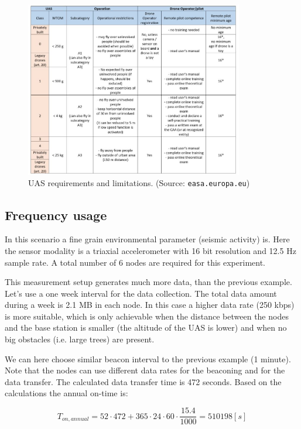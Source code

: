 \documentclass[conference]{IEEEtran}
\begin{document}
\begin{figure}[t]
	\centering
	\includegraphics[width=0.85\textwidth]{fig/legal.png}
  \caption{UAS requirements and limitations. (Source: \texttt{easa.europa.eu})}
	\label{fig-uav-legal}
\end{figure}
\subsection{Frequency usage}

In this scenario a fine grain environmental parameter (seismic activity) is. Here the
sensor modality is a triaxial accelerometer with 16 bit resolution and 12.5 Hz
sample rate. A total number of 6 nodes are required for this experiment.

This measurement setup generates much more data, than the previous example. Let's
use a one week interval for the data collection. The total data amount during
a week is 2.1 MB in each node. In this case a higher data rate (250 kbps) is more
suitable, which is only achievable when the distance between the nodes and the
base station is smaller (the altitude of the UAS is lower) and when no big
obstacles (i.e. large trees) are present.

We can here choose similar beacon interval to the previous example (1 minute). Note
that the nodes can use different data rates for the beaconing and for the
data transfer. The calculated data transfer time is 472 seconds. Based on
the calculations the annual on-time is:

\begin{equation}
    T_{on,annual} = 52 \cdot 472 + 365 \cdot 24 \cdot 60 \cdot \frac{15.4}{1000} = 510198 [s]
\end{equation}
\end{document}
